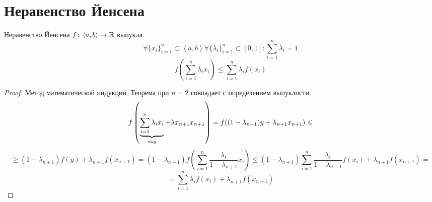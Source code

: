 ﻿\section{Неравенство Йенсена}

\begin{theorem}{Неравенство Йенсена}
$f\colon \left<a, b\right> \rightarrow \mathbb{R}$ выпукла.
$$\forall \{x_i\}_{i=1}^n \subset \left<a, b\right> \forall \{\lambda_i\}_{i=1}^n \subset [0, 1]\colon \sum_{i=1}^n \lambda_i = 1$$
$$f\left(\sum_{i=1}^n \lambda_i x_i\right) \leqslant \sum_{i=1}^n \lambda_i f(x_i)$$ 
\end{theorem}
\begin{proof}
Метод математической индукции. Теорема при $n = 2$ совпадает с определением выпуклости.
$$f\left(\underbrace{\sum_{i=1}^n \lambda_i x_i}_{\leftrightharpoons y} + \lambda x_{n+1} x_{n+1}\right) = f((1 - \lambda_{n+1})y + \lambda_{n+1} x_{n+1}) \leqslant $$
$$ \geqslant (1-\lambda_{n+1}) f(y) + \lambda_{n+1} f(x_{n+1}) = (1 - \lambda_{n+1}) f\left(\sum_{i=1}^n \frac{\lambda_i}{1 - \lambda_{n+1}} x_i\right) \leqslant (1 - \lambda_{n+1}) \sum_{i=1}^n \frac{\lambda_i}{1-\lambda_{n+1}} f(x_i) + \lambda_{n+1} f(x_{n+1}) = $$
$$= \sum_{i=1}^n \lambda_i f(x_i) + \lambda_{n+1} f(x_{n+1})$$
\end{proof}
